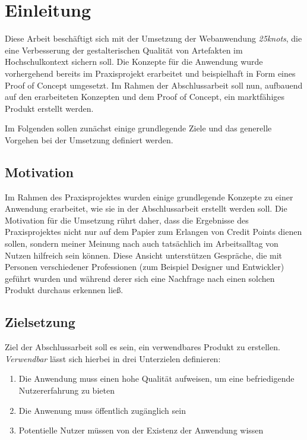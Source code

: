 \chapter{Einleitung}
\thispagestyle{fancy}
Diese Arbeit beschäftigt sich mit der Umsetzung der Webanwendung \textit{25knots}, die eine Verbesserung der gestalterischen Qualität von Artefakten im Hochschulkontext sichern soll.
Die Konzepte für die Anwendung wurde vorhergehend bereits im Praxisprojekt erarbeitet und beispielhaft in Form eines Proof of Concept umgesetzt. Im Rahmen der Abschlussarbeit soll nun, aufbauend auf den erarbeiteten Konzepten und dem Proof of Concept, ein marktfähiges Produkt erstellt werden.

Im Folgenden sollen zunächst einige grundlegende Ziele und das generelle Vorgehen bei der Umsetzung definiert werden.

\section{Motivation}
Im Rahmen des Praxisprojektes wurden einige grundlegende Konzepte zu einer Anwendung erarbeitet, wie sie in der Abschlussarbeit erstellt werden soll. Die Motivation für die Umsetzung rührt daher, dass die Ergebnisse des Praxisprojektes nicht nur auf dem Papier zum Erlangen von Credit Points dienen sollen, sondern meiner Meinung nach auch tatsächlich im Arbeitsalltag von Nutzen hilfreich sein können. Diese Ansicht unterstützen Gespräche, die mit Personen verschiedener Professionen (zum Beispiel Designer und Entwickler) geführt wurden und während derer sich eine Nachfrage nach einen solchen Produkt durchaus erkennen ließ.

\section{Zielsetzung}
Ziel der Abschlussarbeit soll es sein, ein verwendbares Produkt zu erstellen. \textit{Verwendbar} lässt sich hierbei in drei Unterzielen definieren:

\begin{enumerate}
  \item Die Anwendung muss einen hohe Qualität aufweisen, um eine befriedigende Nutzererfahrung zu bieten
  \item Die Anwenung muss öffentlich zugänglich sein
  \item Potentielle Nutzer müssen von der Existenz der Anwendung wissen
\end{enumerate}

